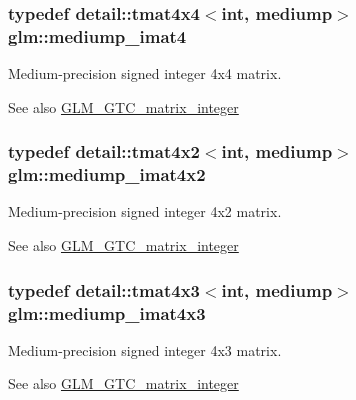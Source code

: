 \subsubsection[{\texorpdfstring{mediump\+\_\+imat4}{mediump_imat4}}]{\setlength{\rightskip}{0pt plus 5cm}typedef detail\+::tmat4x4$<$int, mediump$>$ {\bf glm\+::mediump\+\_\+imat4}}\hypertarget{group__gtc__matrix__integer_gabf1a0fd4c85a21f67535b737e1feb355}{}\label{group__gtc__matrix__integer_gabf1a0fd4c85a21f67535b737e1feb355}
Medium-\/precision signed integer 4x4 matrix. \begin{DoxySeeAlso}{See also}
\hyperlink{group__gtc__matrix__integer}{G\+L\+M\+\_\+\+G\+T\+C\+\_\+matrix\+\_\+integer} 
\end{DoxySeeAlso}
\subsubsection[{\texorpdfstring{mediump\+\_\+imat4x2}{mediump_imat4x2}}]{\setlength{\rightskip}{0pt plus 5cm}typedef detail\+::tmat4x2$<$int, mediump$>$ {\bf glm\+::mediump\+\_\+imat4x2}}\hypertarget{group__gtc__matrix__integer_gacdae7d6ae4820756c62c2b5fd5c0370a}{}\label{group__gtc__matrix__integer_gacdae7d6ae4820756c62c2b5fd5c0370a}
Medium-\/precision signed integer 4x2 matrix. \begin{DoxySeeAlso}{See also}
\hyperlink{group__gtc__matrix__integer}{G\+L\+M\+\_\+\+G\+T\+C\+\_\+matrix\+\_\+integer} 
\end{DoxySeeAlso}
\subsubsection[{\texorpdfstring{mediump\+\_\+imat4x3}{mediump_imat4x3}}]{\setlength{\rightskip}{0pt plus 5cm}typedef detail\+::tmat4x3$<$int, mediump$>$ {\bf glm\+::mediump\+\_\+imat4x3}}\hypertarget{group__gtc__matrix__integer_ga5032ee978a55aa0db4842d5c3cbeade0}{}\label{group__gtc__matrix__integer_ga5032ee978a55aa0db4842d5c3cbeade0}
Medium-\/precision signed integer 4x3 matrix. \begin{DoxySeeAlso}{See also}
\hyperlink{group__gtc__matrix__integer}{G\+L\+M\+\_\+\+G\+T\+C\+\_\+matrix\+\_\+integer} 
\end{DoxySeeAlso}

